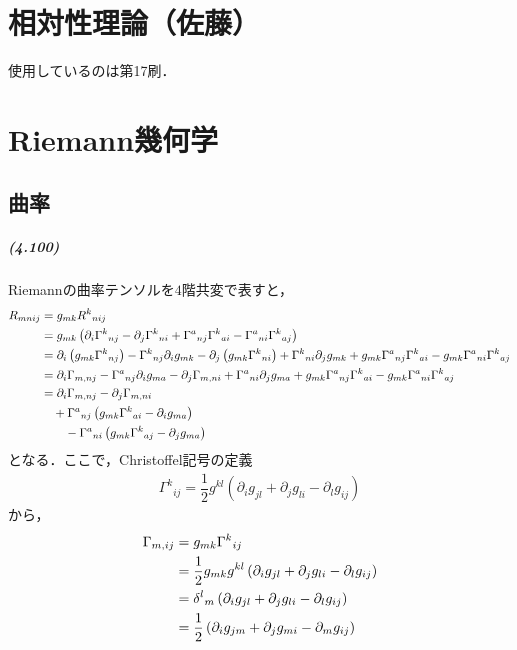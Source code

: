 \documentclass[a4paper]{ltjsreport}
\begin{document}
\chapter*{相対性理論（佐藤）}
使用しているのは第17刷．

\setcounter{chapter}{3}
\chapter{Riemann幾何学}
\setcounter{section}{4}
\section{曲率}
\paragraph{(4.100)}
Riemannの曲率テンソルを$4$階共変で表すと，
\begin{align}
  R_{mnij} &= g_{mk}{R^k}_{nij}\notag\\
  &= g_{mk}\left(\partial_i{\Gamma^k}_{nj} - \partial_j{\Gamma^k}_{ni} + {\Gamma^a}_{nj}{\Gamma^k}_{ai} - {\Gamma^a}_{ni}{\Gamma^k}_{aj}\right)\notag\\
  &= \partial_i\left(g_{mk}{\Gamma^k}_{nj}\right) - {\Gamma^k}_{nj}\partial_ig_{mk}  -
  \partial_j\left(g_{mk}{\Gamma^k}_{ni}\right) + {\Gamma^k}_{ni}\partial_jg_{mk} + g_{mk}{\Gamma^a}_{nj}{\Gamma^k}_{ai} - g_{mk}{\Gamma^a}_{ni}{\Gamma^k}_{aj}\notag\\
  &= \partial_i\Gamma_{m, nj} - {\Gamma^a}_{nj}\partial_ig_{ma}  -
  \partial_j\Gamma_{m, ni} + {\Gamma^a}_{ni}\partial_jg_{ma} + g_{mk}{\Gamma^a}_{nj}{\Gamma^k}_{ai} - g_{mk}{\Gamma^a}_{ni}{\Gamma^k}_{aj}\notag\\
  &= \partial_i\Gamma_{m, nj} - \partial_j\Gamma_{m, ni}\label{R1}\\
  &\quad + {\Gamma^a}_{nj}\left(g_{mk}{\Gamma^k}_{ai} - \partial_ig_{ma}\right)\label{R2}\\
  &\qquad - {\Gamma^a}_{ni}\left(g_{mk}{\Gamma^k}_{aj} - \partial_jg_{ma}\right)\label{R3}
\end{align}
となる．ここで，Christoffel記号の定義
\begin{align*}
  {\Gamma^k}_{ij}=\dfrac{1}{2}g^{kl}\left(\partial_ig_{jl} + \partial_jg_{li} - \partial_lg_{ij}\right)
\end{align*}
から，
\begin{align}
  \Gamma_{m, ij} &= g_{mk}{\Gamma^k}_{ij}\notag\\
  &= \dfrac{1}{2}g_{mk}g^{kl}\left(\partial_ig_{jl} + \partial_jg_{li} - \partial_lg_{ij}\right)\notag\\
  &= {\delta^l}_m\left(\partial_ig_{jl} + \partial_jg_{li} - \partial_lg_{ij}\right)\notag\\
  &= \dfrac{1}{2}\left(\partial_ig_{jm} + \partial_jg_{mi} - \partial_mg_{ij}\right)\label{3cov}
\end{align}
\end{document}
